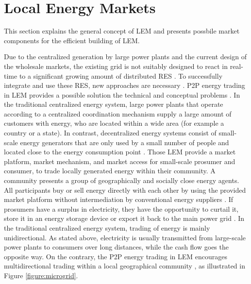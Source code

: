\section{Local Energy Markets}
\label{sec:lem}
This section explains the general concept of LEM
and presents possbile market components for the efficient building of LEM.

Due to the centralized generation by large power plants
and the current design of the wholesale markets, the existing grid is not suitably designed
to react in real-time to a significant growing 
amount of distributed RES .
To successfully integrate and use these RES, new approaches are necessary .
P2P energy trading in LEM provides a possible solution the technical and conceptual problems .
In the traditional centralized energy system, large power plants that operate according to a
centralized coordination mechanism supply a large amount of customers with energy, who are located 
within a wide area (for example a country or a state).
In contrast, decentralized energy systems consist of small-scale energy generators that are 
only used by a small number of people and located close to the energy consumption point .
Those LEM provide a market platform, market mechanism, and market access
for small-scale prosumer and consumer, to trade locally generated energy within their community.
A community presents a group of geographically and socially close energy agents.
All participants buy or sell energy directly with each other by using the provided market platform
without intermediation by conventional energy suppliers .
If prosumers have a surplus in electricity, they have the opportunity 
to curtail it, store it in an energy storage device or export it back to the main power grid .
In the traditional centralized energy system, trading of energy is mainly unidirectional.
As stated above, electricity is usually transmitted from large-scale power plants to 
consumers over long distances, while the cash flow goes the opposite way. 
On the contrary, the P2P energy trading in LEM encourages multidirectional trading within 
a local geographical community , as illustrated in Figure \ref{figure:microgrid}.

